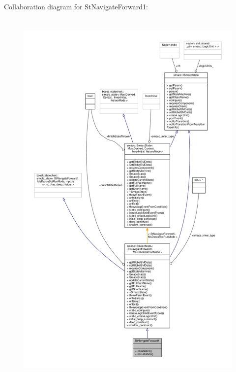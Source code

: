 Collaboration diagram for St\+Navigate\+Forward1\+:
\nopagebreak
\begin{figure}[H]
\begin{center}
\leavevmode
\includegraphics[height=550pt]{structStNavigateForward1__coll__graph}
\end{center}
\end{figure}
